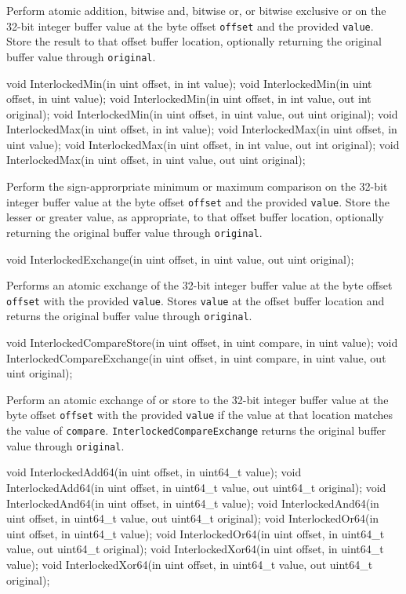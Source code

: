 Perform atomic addition, bitwise and, bitwise or, or bitwise exclusive or on
the 32-bit integer buffer value at the byte offset \texttt{offset} and the provided \texttt{value}.
Store the result to that offset buffer location,
optionally returning the original buffer value through \texttt{original}.

\begin{HLSL}
   void InterlockedMin(in uint offset, in int value);
   void InterlockedMin(in uint offset, in uint value);
   void InterlockedMin(in uint offset, in int value, out int original);
   void InterlockedMin(in uint offset, in uint value, out uint original);
   void InterlockedMax(in uint offset, in int value);
   void InterlockedMax(in uint offset, in uint value);
   void InterlockedMax(in uint offset, in int value, out int original);
   void InterlockedMax(in uint offset, in uint value, out uint original);
\end{HLSL}

Perform the sign-approrpriate minimum or maximum comparison on
the 32-bit integer buffer value at the byte offset \texttt{offset} and the provided \texttt{value}.
Store the lesser or greater value, as appropriate, to that offset buffer location,
optionally returning the original buffer value through \texttt{original}.

\begin{HLSL}
   void InterlockedExchange(in uint offset, in uint value, out uint original);
\end{HLSL}

Performs an atomic exchange of
the 32-bit integer buffer value at the byte offset \texttt{offset} with the provided \texttt{value}.
Stores \texttt{value} at the offset buffer location
and returns the original buffer value through \texttt{original}.

\begin{HLSL}
   void InterlockedCompareStore(in uint offset, in uint compare, in uint value);
   void InterlockedCompareExchange(in uint offset, in uint compare, in uint value,
                                    out uint original);
\end{HLSL}

Perform an atomic exchange of or store to
the 32-bit integer buffer value at the byte offset \texttt{offset} with the provided \texttt{value}
if the value at that location matches the value of \texttt{compare}.
\texttt{InterlockedCompareExchange} returns the original buffer value through \texttt{original}.

\begin{HLSL}
   void InterlockedAdd64(in uint offset, in uint64_t value);
   void InterlockedAdd64(in uint offset, in uint64_t value, out uint64_t original);
   void InterlockedAnd64(in uint offset, in uint64_t value);
   void InterlockedAnd64(in uint offset, in uint64_t value, out uint64_t original);
   void InterlockedOr64(in uint offset, in uint64_t value);
   void InterlockedOr64(in uint offset, in uint64_t value, out uint64_t original);
   void InterlockedXor64(in uint offset, in uint64_t value);
   void InterlockedXor64(in uint offset, in uint64_t value, out uint64_t original);
\end{HLSL}

